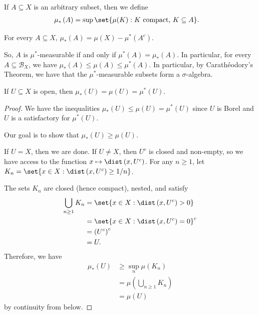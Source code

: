 \documentclass[10pt]{mypackage}
\begin{document}
\begin{definition}
  If $A\subseteq X$ is an arbitrary subset, then we define
  \begin{align*}
    \mu_{\ast}\left( A \right) &= \sup\set{\mu(K) : K\text{ compact, }K\subseteq A}.
  \end{align*}
\end{definition}
\begin{proposition}
  For every $A\subseteq X$, $\mu_{\ast}(A) = \mu(X)-\mu^{\ast}\left( A^{c} \right)$.
\end{proposition}
So, $A$ is $\mu^{\ast}$-measurable if and only if $\mu^{\ast}\left( A \right) = \mu_{\ast}\left( A \right)$. In particular, for every $A\subseteq \mathcal{B}_X$, we have $\mu_{\ast}(A)\leq \mu\left( A \right)\leq \mu^{\ast}\left( A \right)$. In particular, by Carathéodory's Theorem, we have that the $\mu^{\ast}$-measurable subsets form a $\sigma$-algebra.
\begin{proposition}
  If $U\subseteq X$ is open, then $\mu_{\ast}(U) = \mu(U) = \mu^{\ast}\left( U \right)$.
\end{proposition}
\begin{proof}
  We have the inequalities $\mu_{\ast}(U)\leq \mu\left( U \right) = \mu^{\ast}\left( U \right)$ since $U$ is Borel and $U$ is a satisfactory for $\mu^{\ast}\left( U \right)$.

  Our goal is to show that $\mu_{\ast}(U)\geq \mu\left( U \right)$.

  If $U = X$, then we are done. If $U\neq X$, then $U^{c}$ is closed and non-empty, so we have access to the function $x\mapsto \dist\left( x,U^{c} \right)$. For any $n\geq 1$, let $K_n = \set{x\in X : \dist\left( x,U^{c} \right) \geq 1/n}$.

  The sets $K_n$ are closed (hence compact), nested, and satisfy
  \begin{align*}
    \bigcup_{n\geq 1}K_n &= \set{x\in X : \dist\left( x,U^{c} \right) > 0}\\
                         &= \set{x\in X : \dist\left( x,U^{c} \right) = 0}^{c}\\
                         &= \left( U^{c} \right)^{c}\\
                         &= U.
  \end{align*}
  Therefore, we have
  \begin{align*}
    \mu_{\ast}\left( U \right) &\geq \sup_{n}\mu\left( K_n \right)\\
                               &= \mu\left( \bigcup_{n\geq 1}K_n \right)\\
                               &= \mu\left( U \right)
  \end{align*}
  by continuity from below.
\end{proof}
\end{document}
